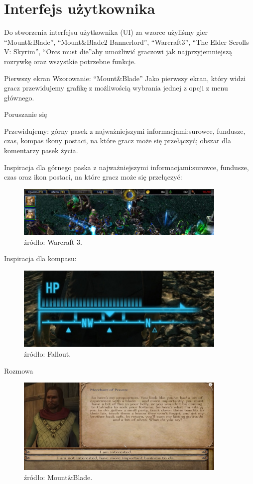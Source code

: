 \chapter{Interfejs użytkownika}\label{chap:ui}
Do stworzenia interfejsu użytkownika (UI) za wzorce użyliśmy gier “Mount&Blade”, “Mount&Blade2 Bannerlord”, “Warcraft3”, “The Elder Scrolls V: Skyrim”, “Orcs must die”aby umożliwić graczowi jak najprzyjemniejszą rozrywkę oraz wszystkie potrzebne funkcje.

Pierwszy ekran
Wzorowanie: “Mount&Blade”
Jako pierwszy ekran, który widzi gracz przewidujemy grafikę z możliwością wybrania jednej z opcji z menu głównego.

Poruszanie się

Przewidujemy:
górny pasek z najważniejszymi informacjami:surowce, fundusze, czas, kompas
ikony postaci, na które gracz może się przełączyć;
obszar dla komentarzy
pasek życia.

Inspiracja dla górnego paska z najważniejszymi informacjami:surowce, fundusze, czas oraz ikon postaci, na które gracz może się przełączyć:
\begin{figure}[htbp]
    \centering
    \includegraphics[width=0.9\textwidth]{images/ui/warcraft3.png}
    \caption{źródło: Warcraft 3.}\label{fig:Warcraft3}
\end{figure}

Inspiracja dla kompasu:
\begin{figure}[htbp]
    \centering
    \includegraphics[width=0.9\textwidth]{images/ui/compassSkyrim.png}
    \caption{źródło: Fallout.}\label{fig:Fallout}
\end{figure}

Rozmowa 
\begin{figure}[htbp]
    \centering
    \includegraphics[width=0.9\textwidth]{images/ui/conversationMnB.png}
    \caption{źródło: Mount&Blade.}\label{fig:MountnBlade}
\end{figure}

